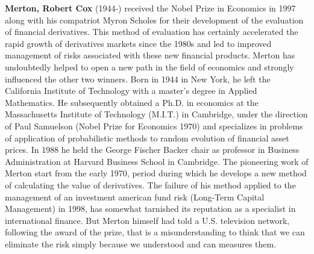 \textbf{Merton, Robert Cox} (1944-) received the Nobel Prize in Economics in 1997 along with his compatriot Myron Scholes for their development of the evaluation of financial derivatives. This method of evaluation has certainly accelerated the rapid growth of derivatives markets since the 1980s and led to improved management of risks associated with these new financial products. Merton has undoubtedly helped to open a new path in the field of economics and strongly influenced the other two winners. Born in 1944 in New York, he left the California Institute of Technology with a master's degree in Applied Mathematics. He subsequently obtained a Ph.D. in economics at the Massachusetts Institute of Technology (M.I.T.) in Cambridge, under the direction of Paul Samuelson (Nobel Prize for Economics 1970) and specializes in problems of application of probabilistic methods to random evolution of financial asset prices. In 1988 he held the George Fischer Backer chair as professor in Business Administration at Harvard Business School in Cambridge. The pioneering work of Merton start from the early 1970, period during which he develops a new method of calculating the value of derivatives. The failure of his method applied to the management of an investment american fund risk (Long-Term Capital Management) in 1998, has somewhat tarnished its reputation as a specialist in international finance. But Merton himself had told a U.S. television network, following the award of the prize, that is a misunderstanding to think that we can eliminate the risk simply because we understood and can measures them.

